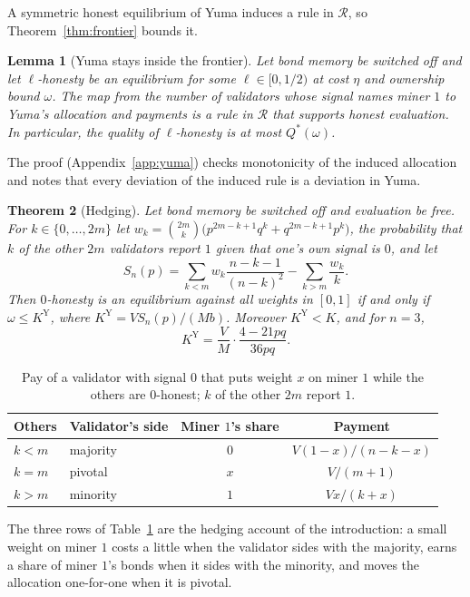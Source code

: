 \documentclass[sigconf,anonymous,review]{acmart}
\numberwithin{equation}{section}
\newtheorem{theorem}{Theorem}[section]
\newtheorem{lemma}[theorem]{Lemma}
\newcommand{\KY}{K^{\mathrm{Y}}}
\newcommand{\Rset}{\mathcal{R}}
\begin{document}
A symmetric honest equilibrium of Yuma induces a rule in $\Rset$, so
Theorem~\ref{thm:frontier} bounds it.

\begin{lemma}[Yuma stays inside the frontier]\label{lem:inherit}
Let bond memory be switched off and let $\ell$-honesty be an equilibrium for
some $\ell\in[0,1/2)$ at cost $\eta$ and ownership bound $\omega$. The map from
the number of validators whose signal names miner $1$ to Yuma's allocation and
payments is a rule in $\Rset$ that supports honest evaluation. In particular,
the quality of $\ell$-honesty is at most $Q^*(\omega)$.
\end{lemma}

The proof (Appendix~\ref{app:yuma}) checks monotonicity of the induced
allocation and notes that every deviation of the induced rule is a deviation in
Yuma.

\begin{theorem}[Hedging]\label{thm:hedging}
Let bond memory be switched off and evaluation be free. For
$k\in\{0,\dots,2m\}$ let
$w_k=\binom{2m}{k}\bigl(p^{2m-k+1}q^k+q^{2m-k+1}p^k\bigr)$, the probability
that $k$ of the other $2m$ validators report $1$ given that one's own signal
is $0$, and let
\[
S_n(p)=\sum_{k<m}w_k\frac{n-k-1}{(n-k)^2}-\sum_{k>m}\frac{w_k}{k}.
\]
Then $0$-honesty is an equilibrium against all weights in $[0,1]$ if and only
if $\omega\le\KY$, where $\KY=VS_n(p)/(Mb)$. Moreover $\KY<K$, and for $n=3$,
\[
\KY=\frac VM\cdot\frac{4-21pq}{36pq}.
\]
\end{theorem}

\begin{table}[t]
\caption{Pay of a validator with signal $0$ that puts weight $x$ on miner $1$
while the others are $0$-honest; $k$ of the other $2m$ report $1$.}
\label{tab:cases}
\small
\begin{tabular}{@{}llcc@{}}
\toprule
Others & Validator's side & Miner $1$'s share & Payment \\
\midrule
$k<m$ & majority & $0$ & $V(1-x)/(n-k-x)$ \\
$k=m$ & pivotal & $x$ & $V/(m+1)$ \\
$k>m$ & minority & $1$ & $Vx/(k+x)$ \\
\bottomrule
\end{tabular}
\end{table}

The three rows of Table~\ref{tab:cases} are the hedging account of the
introduction: a small weight on miner $1$ costs a little when the validator
sides with the majority, earns a share of miner $1$'s bonds when it sides with
the minority, and moves the allocation one-for-one when it is pivotal.
\end{document}
